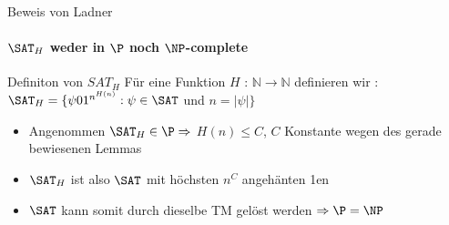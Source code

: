 % 				
% 		
% 	
% 	
\begin{frame}{Beweis von Ladner}
	\framesubtitle{${\SAT}_H$ weder in $\P$ noch  $\NP$-complete}
	\begin{KITinfoblock}{Definiton von ${SAT}_H$}
		Für eine Funktion $H$ : $\mathbb{N} \rightarrow \mathbb{N}$ definieren wir : \newline 	
		${\SAT}_H = \lbrace \psi 01^{n^{H(n)}} : \psi \in \SAT$ und $ n = |\psi| \rbrace$
	\end{KITinfoblock}
	\bigskip
	\pause
	\bigskip
	\begin{itemize}[<+->]
		\item Angenommen ${\SAT}_H \in \P \Rightarrow $  $H(n) \le C$, $C$ Konstante wegen des gerade bewiesenen Lemmas
		\item ${\SAT}_H$ ist also $\SAT$  mit höchsten $n^C$  angehänten 1en
		\item $\SAT$ kann somit durch dieselbe TM gelöst werden $\Rightarrow \P = \NP$
	\end{itemize}
	
\end{frame}

